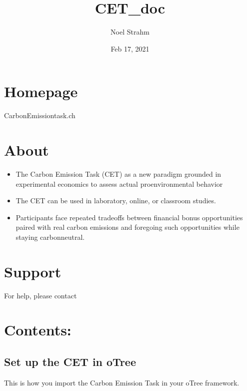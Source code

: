 \documentclass[letterpaper,10pt,english]{sphinxmanual}
\title{CET\_doc}
\date{Feb 17, 2021}
\author{Noel Strahm}
\let\sphinxpxdimen\pdfpxdimen\else\newdimen\sphinxpxdimen
\begin{document}
\pagestyle{empty}
\sphinxmaketitle
\pagestyle{plain}
\sphinxtableofcontents
\pagestyle{normal}
\label{\detokenize{index::doc}}


\noindent{\hspace*{\fill}\sphinxincludegraphics[width=500\sphinxpxdimen,height=293\sphinxpxdimen]{{CET_bild}.png}\hspace*{\fill}}


\chapter{Homepage}
\label{\detokenize{index:homepage}}
Carbon\sphinxhyphen{}Emission\sphinxhyphen{}task.ch


\chapter{About}
\label{\detokenize{index:about}}\begin{itemize}
\item {} 
The Carbon Emission Task (CET) as a new paradigm grounded in experimental economics to assess actual pro\sphinxhyphen{}environmental behavior

\item {} 
The CET can be used in laboratory, online, or classroom studies.

\item {} 
Participants face repeated tradeoffs between financial bonus opportunities paired with real carbon emissions and foregoing such opportunities while staying carbon\sphinxhyphen{}neutral.

\end{itemize}


\chapter{Support}
\label{\detokenize{index:support}}
For help, please contact 


\chapter{Contents:}
\label{\detokenize{index:contents}}



\section{Set up the CET in oTree}
\label{\detokenize{setup_in_otree:set-up-the-cet-in-otree}}\label{\detokenize{setup_in_otree:setup-in-otree}}\label{\detokenize{setup_in_otree::doc}}
This is how you import the Carbon Emission Task in your oTree framework.
\end{document}
